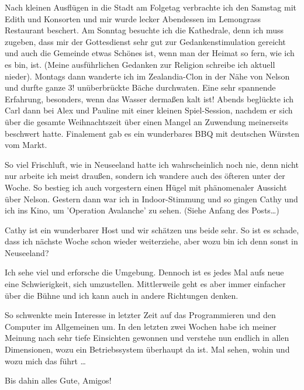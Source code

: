 Nach kleinen Ausflügen in die Stadt am Folgetag verbrachte ich den
Samstag mit Edith und Konsorten und mir wurde lecker Abendessen im
Lemongrass Restaurant beschert. Am Sonntag besuchte ich die Kathedrale,
denn ich muss zugeben, dass mir der Gottesdienst sehr gut zur
Gedankenstimulation gereicht und auch die Gemeinde etwas Schönes ist,
wenn man der Heimat so fern, wie ich es bin, ist. (Meine ausführlichen
Gedanken zur Religion schreibe ich aktuell nieder). Montags dann
wanderte ich im Zealandia-Clon in der Nähe von Nelson und durfte ganze
3! unüberbrückte Bäche durchwaten. Eine sehr spannende Erfahrung,
besonders, wenn das Wasser dermaßen kalt ist! Abends beglückte ich Carl
dann bei Alex und Pauline mit einer kleinen Spiel-Session, nachdem er
sich über die gesamte Weihnachtszeit über einen Mangel an Zuwendung
meinerseits beschwert hatte. Finalement gab es ein wunderbares BBQ mit
deutschen Würsten vom Markt.

So viel Frischluft, wie in Neuseeland hatte ich wahrscheinlich noch nie,
denn nicht nur arbeite ich meist draußen, sondern ich wandere auch des
öfteren unter der Woche. So bestieg ich auch vorgestern einen Hügel mit
phänomenaler Aussicht über Nelson. Gestern dann war ich in
Indoor-Stimmung und so gingen Cathy und ich ins Kino, um 'Operation
Avalanche' zu sehen. (Siehe Anfang des Posts\ldots)

Cathy ist ein wunderbarer Host und wir schätzen uns beide sehr. So ist
es schade, dass ich nächste Woche schon wieder weiterziehe, aber wozu
bin ich denn sonst in Neuseeland?

Ich sehe viel und erforsche die Umgebung. Dennoch ist es jedes Mal aufs
neue eine Schwierigkeit, sich umzustellen. Mittlerweile geht es aber
immer einfacher über die Bühne und ich kann auch in andere Richtungen
denken.

So schwenkte mein Interesse in letzter Zeit auf das Programmieren und
den Computer im Allgemeinen um. In den letzten zwei Wochen habe ich
meiner Meinung nach sehr tiefe Einsichten gewonnen und verstehe nun
endlich in allen Dimensionen, wozu ein Betriebssystem überhaupt da ist.
Mal sehen, wohin und wozu mich das führt \ldots{}

Bis dahin alles Gute, Amigos!
